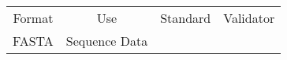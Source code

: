 \begin{tabular}{cccc}
{Format} & {Use} & {Standard} & {Validator} \\
FASTA & Sequence Data
\end{tabular}